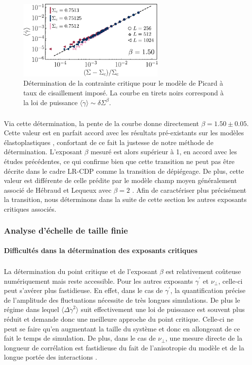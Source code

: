 \begin{figure}[h]
	\centering
	\includegraphics[width=0.65\textwidth]{Chapitre4/Figures/CasPhysique/CP_Classic.pdf}
	\caption{Détermination de la contrainte critique pour le modèle de Picard à taux de cisaillement imposé. La courbe en tirets noirs correspond à la loi de puissance $\langle\dot{\gamma}\rangle \sim \delta\Sigma^\beta$.}
	\label{fig:CP_Classic}
\end{figure}

\subparagraph{}Via cette détermination, la pente de la courbe donne directement $\beta=1.50 \pm 0.05$. Cette valeur est en parfait accord avec les résultats pré-existants sur les modèles élastoplastiques \cite{ferrero_criticality_2019, lin_scaling_2014}, confortant de ce fait la justesse de notre méthode de détermination. L'exposant $\beta$ mesuré est alors supérieur à 1, en accord avec les études précédentes, ce qui confirme bien que cette transition ne peut pas être décrite dans le cadre LR-CDP comme la transition de dépiégeage. De plus, cette valeur est différente de celle prédite par le modèle champ moyen généralement associé de Hébraud et Lequeux avec $\beta=2$ \cite{hebraud_mode-coupling_1998}. Afin de caractériser plus précisément la transition, nous déterminons dans la suite de cette section les autres exposants critiques associés.

\subsubsection{Analyse d'échelle de taille finie}

\paragraph{Difficultés dans la détermination des exposants critiques}

\subparagraph{}La détermination du point critique et de l'exposant $\beta$ est relativement coûteuse numériquement mais reste accessible. Pour les autres exposants $\gamma^\prime$ et $\nu_\perp$, celle-ci peut s'avérer plus fastidieuse. En effet, dans le cas de $\gamma^\prime$, la quantification précise de l'amplitude des fluctuations nécessite de très longues simulations. De plus le régime dans lequel $\langle\Delta\dot{\gamma}^2\rangle$ suit effectivement une loi de puissance est souvent plus réduit et demande donc une meilleure approche du point critique. Celle-ci ne peut se faire qu'en augmentant la taille du système et donc en allongeant de ce fait le temps de simulation. De plus, dans le cas de $\nu_\perp$, une mesure directe de la longueur de corrélation est fastidieuse du fait de l'anisotropie du modèle et de la longue portée des interactions \cite{liu_critical_2016}.

